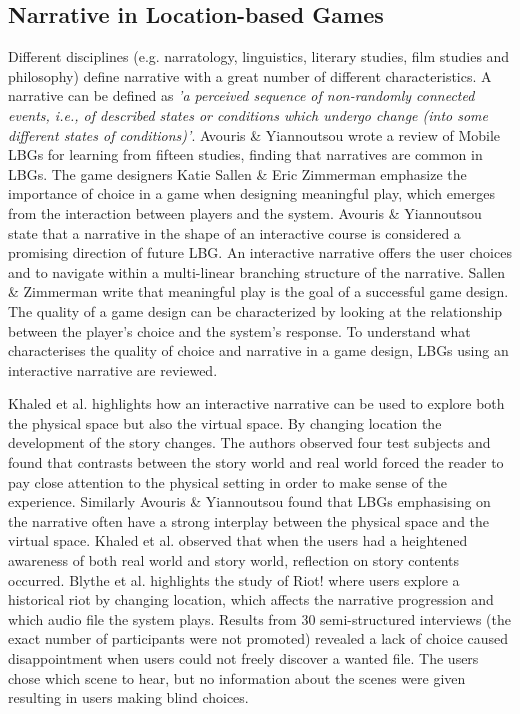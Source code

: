 \subsection{Narrative in Location-based Games}
Different disciplines (e.g. narratology, linguistics, literary studies, film studies and philosophy) define narrative with a great number of different characteristics\cite{Grimaldi}. A narrative can be defined as \emph{'a perceived sequence of non-randomly connected events, i.e., of described states or conditions which undergo change (into some different states of conditions)'}\cite{narrativeDef}. Avouris \& Yiannoutsou wrote a review of Mobile LBGs for learning from fifteen studies, finding that narratives are common in LBGs\cite{LBG_Review}. The game designers Katie Sallen \& Eric Zimmerman emphasize the importance of choice in a game when designing meaningful play, which emerges from the interaction between players and the system\cite{RulesofPlay}. Avouris \& Yiannoutsou state that a narrative in the shape of an interactive course is considered a promising direction of future LBG\cite{LBG_Review}. An interactive narrative offers the user choices and to navigate within a multi-linear branching structure of the narrative\cite{ryanavatars}. Sallen \& Zimmerman write that meaningful play is the goal of a successful game design. The quality of a game design can be characterized by looking at the relationship between the player’s choice and the system’s response\cite{KrausBog}. To understand what characterises the quality of choice and narrative in a game design, LBGs using an interactive narrative are reviewed.
 
Khaled et al. highlights how an interactive narrative can be used to explore both the physical space but also the virtual space. By changing location the development of the story changes. The authors observed four test subjects and found that contrasts between the story world and real world forced the reader to pay close attention to the physical setting in order to make sense of the experience\cite{StoryTrek}. Similarly Avouris \& Yiannoutsou found that LBGs emphasising on the narrative often have a strong interplay between the physical space and the virtual space\cite{LBG_Review}. Khaled et al. observed that when the users had a heightened awareness of both real world and story world, reflection on story contents occurred\cite{StoryTrek}. Blythe et al. highlights the study of Riot! where users explore a historical riot by changing location, which affects the narrative progression and which audio file the system plays. Results from 30 semi-structured interviews (the exact number of participants were not promoted) revealed a lack of choice caused disappointment when users could not freely discover a wanted file. The users chose which scene to hear, but no information about the scenes were given resulting in users making blind choices\cite{InterdisciplinaryCriticism}.